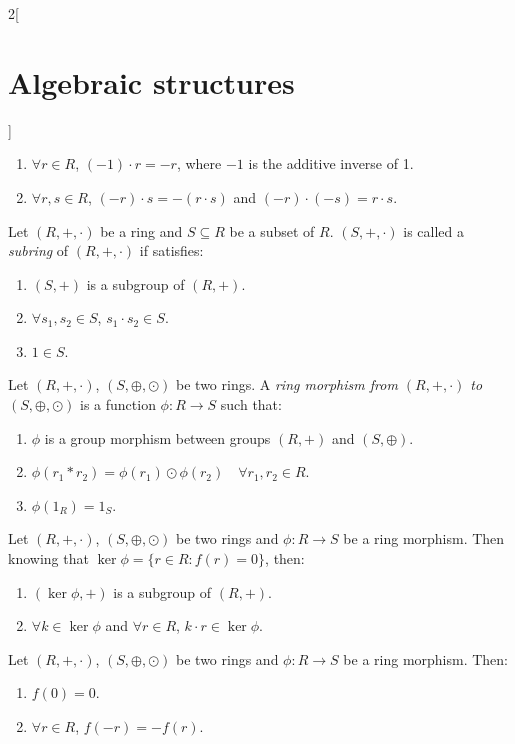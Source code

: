 \documentclass[class=article,10pt,crop=false]{standalone}
\begin{document}
\begin{multicols}{2}[\section{Algebraic structures}]
\begin{lemma}
\begin{enumerate}
    \item $\forall r\in R$, $(-1)\cdot r=-r$, where $-1$ is the additive inverse of 1.
    \item $\forall r,s\in R$, $(-r)\cdot s=-(r\cdot s)$ and $(-r)\cdot (-s)=r\cdot s$.
\end{enumerate}
\end{lemma}
\begin{definition}[Subring]
Let $(R,+,\cdot)$ be a ring and $S\subseteq R$ be a subset of $R$. $(S,+,\cdot)$ is called a \textit{subring} of $(R,+,\cdot)$ if satisfies:
\begin{enumerate}
    \item $(S,+)$ is a subgroup of $(R,+)$.
    \item $\forall s_1,s_2\in S$, $s_1\cdot s_2\in S$.
    \item $1\in S$.
\end{enumerate}
\end{definition}
\begin{definition}
Let $(R,+,\cdot)$, $(S,\oplus,\odot)$ be two rings. A \textit{ring morphism from $(R,+,\cdot)$ to $(S,\oplus,\odot)$} is a function $\phi:R\rightarrow S$ such that:
\begin{enumerate}
    \item $\phi$ is a group morphism between groups $(R,+)$ and $(S,\oplus)$.
    \item $\phi(r_1*r_2)=\phi(r_1)\odot\phi(r_2)\quad\forall r_1,r_2\in R$.
    \item $\phi(1_R)=1_S$.
\end{enumerate}
\end{definition}
\begin{lemma}
Let $(R,+,\cdot)$, $(S,\oplus,\odot)$ be two rings and $\phi:R\rightarrow S$ be a ring morphism. Then knowing that $\ker\phi=\{r\in R:f(r)=0\}$, then:
\begin{enumerate}
    \item $(\ker\phi,+)$ is a subgroup of $(R,+)$.
    \item $\forall k\in\ker\phi$ and $\forall r\in R$, $k\cdot r\in\ker\phi$.
\end{enumerate}
\end{lemma}
\begin{prop}
Let $(R,+,\cdot)$, $(S,\oplus,\odot)$ be two rings and $\phi:R\rightarrow S$ be a ring morphism. Then:
\begin{enumerate}
    \item $f(0)=0$.
    \item $\forall r\in R$, $f(-r)=-f(r)$.

\end{enumerate}
\end{prop}
\end{multicols}
\end{document}
